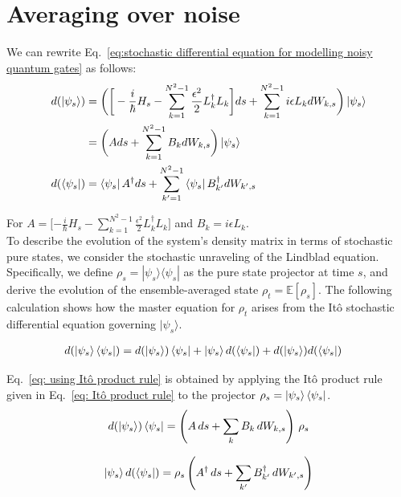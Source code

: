 \documentclass[9pt,a4paper,twocolumn,twoside]{tau-class/tau}
\begin{document}
\section{Averaging over noise}
\label{appendix:Averaging over noise}

We can rewrite Eq.~\eqref{eq:stochastic differential equation for modelling noisy quantum gates} as follows: 
\begin{align}
    d(\ket{\psi_s}) &= \bigg(\bigg[- \frac{i}{\hbar} H_s - \sum_{k=1}^{N^2-1}  \frac{\epsilon^2}{2} L_k^\dagger L_k \bigg]ds + \sum_{k=1}^{N^2-1}i\epsilon L_k d W_{k,s} \bigg)\ket{\psi_s} \notag\\
    &= \bigg(Ads + \sum_{k=1}^{N^2-1} B_k dW_{k,s} \bigg)\ket{\psi_s} \\
    d(\bra{\psi_s}) &= \bra{\psi_s} A^\dagger ds + \sum_{k'=1}^{N^2-1} \bra{\psi_s} B_{k'}^\dagger dW_{k',s}
\end{align}

For $A = [- \frac{i}{\hbar} H_s - \sum_{k=1}^{N^2-1}  \frac{\epsilon^2}{2} L_k^\dagger L_k \bigg]$ and $B_k = i\epsilon L_k$.\\
To describe the evolution of the system's density matrix in terms of stochastic pure states, we consider the stochastic unraveling of the Lindblad equation. Specifically, we define \( \rho_s = |\psi_s\rangle\langle\psi_s| \) as the pure state projector at time \( s \), and derive the evolution of the ensemble-averaged state \( \rho_t = \mathbb{E}[\rho_s] \). The following calculation shows how the master equation for \( \rho_t \) arises from the Itô stochastic differential equation governing \( |\psi_s\rangle \).

\begin{align}
    d(\ket{\psi_s}\bra{\psi_s}) &= d(\ket{\psi_s}) \bra{\psi_s} + \ket{\psi_s} d(\bra{\psi_s}) + d(\ket{\psi_s}) d(\bra{\psi_s})
    \label{eq: using Itô product rule}
\end{align}

Eq.~\eqref{eq: using Itô product rule} is obtained by applying the Itô product rule given in Eq.~\eqref{eq: Itô product rule} to the projector \( \rho_s = \ket{\psi_s} \bra{\psi_s} \).
\begin{equation}
d(\ket{\psi_s}) \bra{\psi_s} 
= \left(A \, ds + \sum_k B_k\, dW_{k,s}\right)\, \rho_s
\label{eq:diff1}
\end{equation}

\begin{equation}
\ket{\psi_s} d(\bra{\psi_s}) 
= \rho_s \left(A^\dagger \, ds + \sum_{k'} B^\dagger_{k'}\, dW_{k',s}\right)
\label{eq:diff2}
\end{equation}
\end{document}
